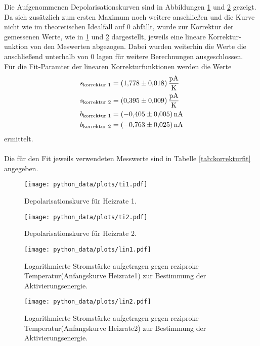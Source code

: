 Die Aufgenommenen Depolarisationskurven sind in Abbildungen \ref{fig:TI1} und \ref{fig:TI2} gezeigt. Da sich zusätzlich zum ersten Maximum noch weitere anschließen und die
Kurve nicht wie im theoretischen Idealfall auf $0$ abfällt, wurde zur Korrektur der gemessenen Werte, wie in \ref{fig:TI1} und \ref{fig:TI2} dargestellt,
jeweils eine lineare Korrektur-unktion von den Meswerten abgezogen.
Dabei wurden weiterhin die Werte die anschließend unterhalb von $0$ lagen für weitere Berechnungen ausgeschlossen.\\
Für die Fit-Paramter der linearen Korrekturfunktionen werden die Werte
\begin{align*}
  s_\text{korrektur 1} &= \SI{1.778+-0.018}{\pico\ampere\per\kelvin}\\
  s_\text{korrektur 2} &= \SI{0.395+-0.009}{\pico\ampere\per\kelvin}\\
  b_\text{korrektur 1} &= \SI{-0.405+-0.005}{\nano\ampere}\\
  b_\text{korrektur 2} &= \SI{-0.763+-0.025}{\nano\ampere}
\end{align*}
ermittelt.\\ \\
Die für den Fit jeweils verwendeten Messwerte sind in Tabelle \ref{tab:korrekturfit} angegeben.
\begin{figure}
  \centering
  \texttt{[image: python\_data/plots/ti1.pdf]}
  \caption{Depolarisationskurve für Heizrate 1.}
  \label{fig:TI1}
\end{figure}

\begin{figure}
  \centering
  \texttt{[image: python\_data/plots/ti2.pdf]}
  \caption{Depolarisationskurve für Heizrate 2.}
  \label{fig:TI2}
\end{figure}

\begin{figure}
  \centering
  \texttt{[image: python\_data/plots/lin1.pdf]}
  \caption{Logarithmierte Stromstärke aufgetragen gegen reziproke Temperatur(Anfangskurve Heizrate1) zur Bestimmung der Aktivierungsenergie.}
  \label{fig:lin1}
\end{figure}

\begin{figure}
  \centering
  \texttt{[image: python\_data/plots/lin2.pdf]}
  \caption{Logarithmierte Stromstärke aufgetragen gegen reziproke Temperatur(Anfangskurve Heizrate2) zur Bestimmung der Aktivierungsenergie.}
  \label{fig:lin2}
\end{figure}

